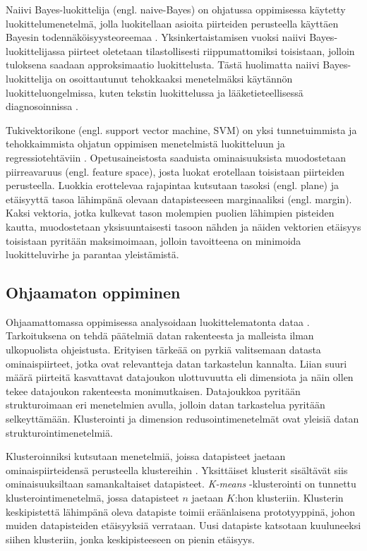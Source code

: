 \documentclass[utf8]{gradu3}
\begin{document}
Naiivi Bayes-luokittelija (engl. naive-Bayes) on ohjatussa oppimisessa käytetty luokittelumenetelmä, jolla luokitellaan asioita piirteiden perusteella käyttäen Bayesin todennäköisyysteoreemaa \parencite{nasteski2017overview,rish2001empirical}. Yksinkertaistamisen vuoksi naiivi Bayes-luokittelijassa piirteet oletetaan tilastollisesti riippumattomiksi toisistaan, jolloin tuloksena saadaan approksimaatio luokittelusta. Tästä huolimatta naiivi Bayes-luokittelija on osoittautunut tehokkaaksi menetelmäksi käytännön luokitteluongelmissa, kuten tekstin luokittelussa ja lääketieteellisessä diagnosoinnissa \parencite{rish2001empirical}.

Tukivektorikone (engl. support vector machine, SVM) on yksi tunnetuimmista ja tehokkaimmista ohjatun oppimisen menetelmistä luokitteluun ja regressiotehtäviin \parencite{cervantes2020comprehensive,osisanwo2017supervised}. Opetusaineistosta saaduista ominaisuuksista muodostetaan piirreavaruus (engl. feature space), josta luokat erotellaan toisistaan piirteiden perusteella. Luokkia erottelevaa rajapintaa kutsutaan tasoksi (engl. plane) ja etäisyyttä tasoa lähimpänä olevaan datapisteeseen marginaaliksi (engl. margin). Kaksi vektoria, jotka kulkevat tason molempien puolien lähimpien pisteiden kautta, muodostetaan yksisuuntaisesti tasoon nähden ja näiden vektorien etäisyys toisistaan pyritään maksimoimaan, jolloin tavoitteena on minimoida luokitteluvirhe ja parantaa yleistämistä.

\subsection{Ohjaamaton oppiminen}

Ohjaamattomassa oppimisessa analysoidaan luokittelematonta dataa \parencite{das2017survey,jordan2015machine}. Tarkoituksena on tehdä päätelmiä datan rakenteesta ja malleista ilman ulkopuolista ohjeistusta. Erityisen tärkeää on pyrkiä valitsemaan datasta ominaispiirteet, jotka ovat relevantteja datan tarkastelun kannalta. Liian suuri määrä piirteitä kasvattavat datajoukon ulottuvuutta eli dimensiota ja näin ollen tekee datajoukon rakenteesta monimutkaisen. Datajoukkoa pyritään strukturoimaan eri menetelmien avulla, jolloin datan tarkastelua pyritään selkeyttämään. Klusterointi ja dimension redusointimenetelmät ovat yleisiä datan strukturointimenetelmiä.

Klusteroinniksi kutsutaan menetelmiä, joissa datapisteet jaetaan ominaispiirteidensä perusteella klustereihin \parencite{usama2019unsupervised}. Yksittäiset klusterit sisältävät siis ominaisuuksiltaan samankaltaiset datapisteet. \textit{K-means} -klusterointi on tunnettu klusterointimenetelmä, jossa datapisteet \(n\) jaetaan \(K\):hon klusteriin. Klusterin keskipistettä lähimpänä oleva datapiste toimii eräänlaisena prototyyppinä, johon muiden datapisteiden etäisyyksiä verrataan. Uusi datapiste katsotaan kuuluneeksi siihen klusteriin, jonka keskipisteeseen on pienin etäisyys.
\end{document}

